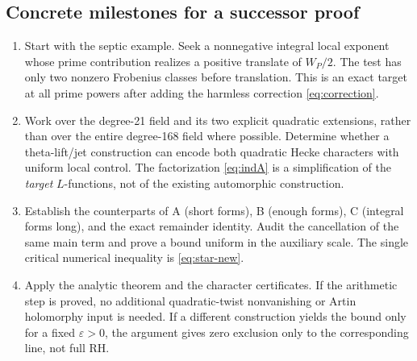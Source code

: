 \documentclass[11pt]{article}
\theoremstyle{remark}\newtheorem{remark}[theorem]{Remark}
\begin{document}
\subsection{Concrete milestones for a successor proof}
\begin{enumerate}[leftmargin=*,label=\arabic*.]
\item Start with the septic example. Seek a nonnegative integral local exponent whose prime contribution realizes a positive translate of $W_P/2$. The test has only two nonzero Frobenius classes before translation. This is an exact target at all prime powers after adding the harmless correction \eqref{eq:correction}.
\item Work over the degree-21 field and its two explicit quadratic extensions, rather than over the entire degree-168 field where possible. Determine whether a theta-lift/jet construction can encode both quadratic Hecke characters with uniform local control. The factorization \eqref{eq:indA} is a simplification of the \emph{target} $L$-functions, not of the existing automorphic construction.
\item Establish the counterparts of A (short forms), B (enough forms), C (integral forms long), and the exact remainder identity. Audit the cancellation of the same main term and prove a bound uniform in the auxiliary scale. The single critical numerical inequality is \eqref{eq:star-new}.
\item Apply the analytic theorem and the character certificates. If the arithmetic step is proved, no additional quadratic-twist nonvanishing or Artin holomorphy input is needed. If a different construction yields the bound only for a fixed $\varepsilon>0$, the argument gives zero exclusion only to the corresponding line, not full RH.
\end{enumerate}
\end{document}
